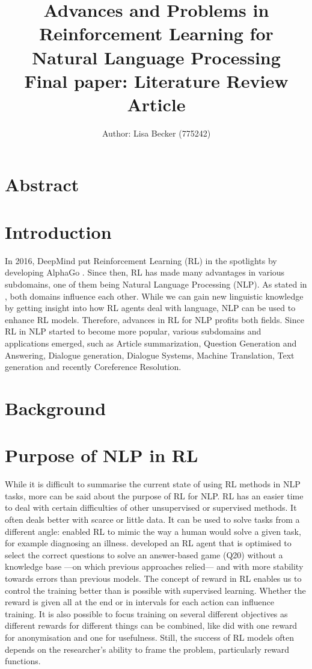 \documentclass[11pt,a4paper]{article}
\title{{\LARGE Advances and Problems in Reinforcement Learning for Natural Language Processing}\\[1.5mm]
{\large Final paper: Literature Review Article}\\[1.5mm]}
\author{Author: Lisa Becker (775242) }
\begin{document}
\maketitle
\section{Abstract}


\section{Introduction}
In 2016, DeepMind put Reinforcement Learning (RL) in the spotlights by developing AlphaGo \citep{alphago}. Since then, RL has made many advantages in various subdomains, one of them being Natural Language Processing (NLP). As stated in \citet{ijcai2019}, both domains influence each other. While we can gain new linguistic knowledge by getting insight into how RL agents deal with language, NLP can be used to enhance RL models. Therefore, advances in RL for NLP profits both fields. Since RL in NLP started to become more popular, various subdomains and applications emerged, such as Article summarization, Question Generation and Answering, Dialogue generation, Dialogue Systems, Machine Translation, Text generation and recently Coreference Resolution. 

\section{Background}

\section{Purpose of NLP in RL}
While it is difficult to summarise the current state of using RL methods in NLP tasks, more can be said about the purpose of RL for NLP. RL has an easier time to deal with certain difficulties of other unsupervised or supervised methods. It often deals better with scarce or little data. It can be used to solve tasks from a different angle: \citet{ling-etal-2017-learning} enabled RL to mimic the way a human would solve a given task, for example diagnosing an illness. \citet{hu-etal-2018-playing} developed an RL agent that is optimised to select the correct questions to solve an answer-based game (Q20) without a knowledge base ---on which previous approaches relied--- and with more stability towards errors than previous models. The concept of reward in RL enables us to control the training better than is possible with supervised learning. Whether the reward is given all at the end or in intervals for each action can influence training. It is also possible to focus training on several different objectives as different rewards for different things can be combined, like \citet{mosallanezhad-etal-2019-deep} did with one reward for anonymisation and one for usefulness. Still, the success of RL models often depends on the researcher's ability to frame the problem, particularly reward functions.
\end{document}
